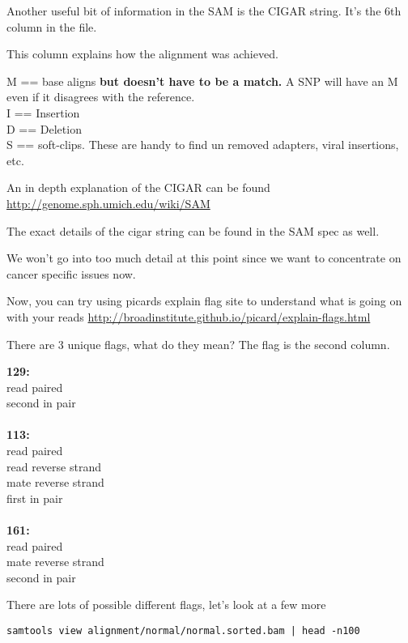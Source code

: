 Another useful bit of information in the SAM is the CIGAR string.
It's the 6th column in the file. 

This column explains how the alignment was achieved.
 
        M == base aligns \textbf{but doesn't have to be a match.} A SNP will have an M even if it disagrees with the reference.\\
        I == Insertion\\
        D == Deletion\\
        S == soft-clips. These are handy to find un removed adapters, viral insertions, etc.

An in depth explanation of the CIGAR can be found \url{http://genome.sph.umich.edu/wiki/SAM}

The exact details of the cigar string can be found in the SAM spec as well.


We won't go into too much detail at this point since we want to concentrate on cancer specific issues now.


Now, you can try using picards explain flag site to understand what is going on with your reads
\url{http://broadinstitute.github.io/picard/explain-flags.html}

\begin{questions} 
There are 3 unique flags, what do they mean? The flag is the second column.
\end{questions}
\begin{answer}
\textbf{129:}\\ 
    read paired\\
    second in pair\\ \\
\textbf{113:}\\
    read paired\\
    read reverse strand\\
    mate reverse strand\\
    first in pair\\ \\
\textbf{161:}\\
    read paired\\
    mate reverse strand\\
    second in pair\\
\end{answer}

There are lots of possible different flags, let's look at a few more
\begin{lstlisting}
samtools view alignment/normal/normal.sorted.bam | head -n100
\end{lstlisting}



